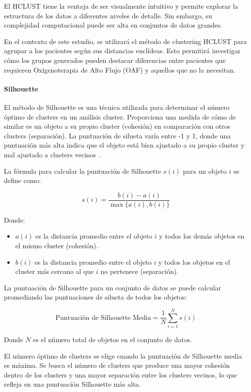 El HCLUST tiene la ventaja de ser visualmente intuitivo y permite explorar la estructura de los datos a diferentes niveles de detalle. Sin embargo, su complejidad computacional puede ser alta en conjuntos de datos grandes.

En el contexto de este estudio, se utilizará el método de clustering HCLUST para agrupar a los pacientes según sus distancias euclídeas. Esto permitirá investigar cómo los grupos generados pueden destacar diferencias entre pacientes que requieren Oxigenoterapia de Alto Flujo (OAF) y aquellos que no la necesitan.

\paragraph{Silhouette}\label{sec:silhouette}
El método de Silhouette es una técnica utilizada para determinar el número óptimo de clusters en un análisis cluster. Proporciona una medida de cómo de similar es un objeto a su propio cluster (cohesión) en comparación con otros clusters (separación). La puntuación de silueta varía entre -1 y 1, donde una puntuación más alta indica que el objeto está bien ajustado a su propio cluster y mal ajustado a clusters vecinos~\cite{rousseeuw1987silhouettes}.

La fórmula para calcular la puntuación de Silhouette \(s(i)\) para un objeto \(i\) se define como:

\[ s(i) = \frac{b(i) - a(i)}{\max\{a(i), b(i)\}} \]

Donde:
\begin{itemize}
    \item \(a(i)\) es la distancia promedio entre el objeto \(i\) y todos los demás objetos en el mismo cluster (cohesión).
    \item \(b(i)\) es la distancia promedio entre el objeto \(i\) y todos los objetos en el cluster más cercano al que \(i\) no pertenece (separación).
\end{itemize}

La puntuación de Silhouette para un conjunto de datos se puede calcular promediando las puntuaciones de silueta de todos los objetos:

\[ \text{Puntuación de Silhouette Media} = \frac{1}{N} \sum_{i=1}^{N} s(i) \]

Donde \(N\) es el número total de objetos en el conjunto de datos.

El número óptimo de clusters se elige cuando la puntuación de Silhouette media es máxima. Se busca el número de clusters que produce una mayor cohesión dentro de los clusters y una mayor
separación entre los clusters vecinos, lo que refleja en una puntuación Silhouette más alta.



